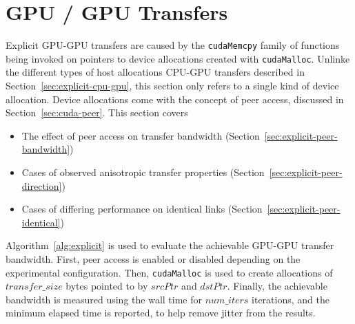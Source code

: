 \section{GPU / GPU Transfers}
\label{sec:explicit-gpu-gpu}

Explicit GPU-GPU transfers are caused by the \texttt{cudaMemcpy} family of functions being invoked on pointers to device allocations created with \texttt{cudaMalloc}.
Unlinke the different types of host allocations CPU-GPU transfers described in Section~\ref{sec:explicit-cpu-gpu}, this section only refers to a single kind of device allocation.
Device allocations come with the concept of peer access, discussed in Section~\ref{sec:cuda-peer}.
This section covers
\begin{itemize}
\item The effect of peer access on transfer bandwidth (Section~\ref{sec:explicit-peer-bandwidth})
\item Cases of observed anisotropic transfer properties (Section~\ref{sec:explicit-peer-direction})
\item Cases of differing performance on identical links (Section~\ref{sec:explicit-peer-identical})
\end{itemize}

Algorithm~\ref{alg:explicit} is used to evaluate the achievable GPU-GPU transfer bandwidth.
First, peer access is enabled or disabled depending on the experimental configuration.
Then, \texttt{cudaMalloc} is used to create allocations of $transfer\_size$ bytes pointed to by $srcPtr$ and $dstPtr$.
Finally, the achievable bandwidth is measured using the wall time for $num\_iters$ iterations, and the minimum elapsed time is reported, to help remove jitter from the results.

